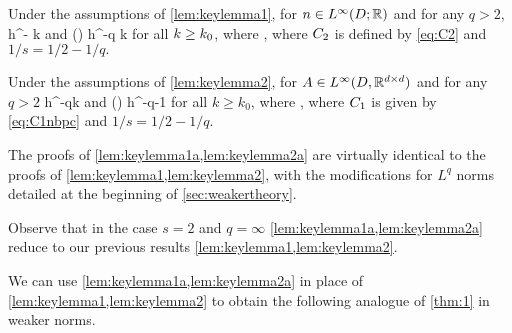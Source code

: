 \label{lem:keylemma1a}
Under the assumptions of \cref{lem:keylemma1}, for $n\in \LiDRR$ and for any $q > 2$,
\beq\label{eq:keybound12}
\max\set{\NDk{\AmatoI \Mmatn},\NDkI{\Mmatn\AmatoI}} \leq \Cttilde h^{-} k
\eeq
and 
\beq\label{eq:keybound1a2}
\max\set{\Nt{\AmatoI \Mmatn},\Nt{\Mmatn\AmatoI}} \leq \Cttilde\mleft(\frac{\mplus}{\mminus}\mright) h^{-q} k
\eeq
for all $k\geq k_{0}$,
where
\beq\label{eq:C2tilde}
\Cttilde\de%
\Cinvs\Ct,
\eeq
where $C_{2}$ is defined by \cref{eq:C2} and $1/s = 1/2 - 1/q.$
\ele

\label{lem:keylemma2a}
Under the assumptions of \cref{lem:keylemma2}, for $A\in L^\infty(D,\mathbb R^{d\times d})$ and for any $q > 2$
\beq\label{eq:keybound22}
\max\set{\NDk{\AmatoI \SmatA},\NDkI{\SmatA\AmatoI}} \leq \Cotilde h^{-q}k 
\eeq
and
\beq\label{eq:keybound2a2}
\max\set{\Nt{\AmatoI \SmatA},\Nt{\SmatA\AmatoI}} \leq \Cotilde\mleft(\frac{\splus}{\mminus}\mright) h^{-q-1} 
\eeq
for all $k\geq k_0$, where
\beq\label{eq:C1tildenbpc}
\Cotilde \de \Cinvs\Co,
\eeq
where $C_{1}$ is given by \cref{eq:C1nbpc} and $1/s = 1/2 - 1/q.$
\ele

The proofs of \cref{lem:keylemma1a,lem:keylemma2a} are virtually identical to the proofs of \cref{lem:keylemma1,lem:keylemma2}, with the modifications for $L^q$ norms detailed at the beginning of \cref{sec:weakertheory}.

Observe that in the case $s=2$ and $q=\infty$ \cref{lem:keylemma1a,lem:keylemma2a} reduce to our previous results \cref{lem:keylemma1,lem:keylemma2}.
\ere

We can use \cref{lem:keylemma1a,lem:keylemma2a} in place of \cref{lem:keylemma1,lem:keylemma2} to obtain the following analogue of \cref{thm:1} in weaker norms.

